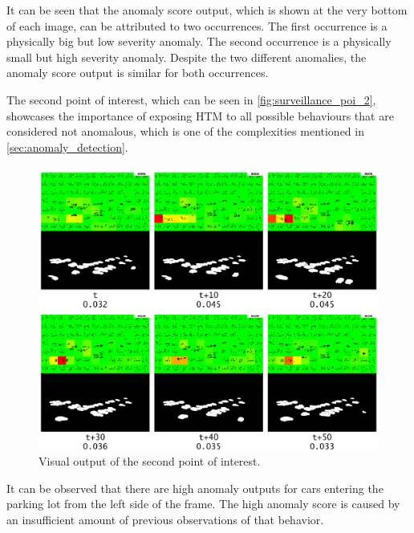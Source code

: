 It can be seen that the anomaly score output, which is shown at the very bottom of each image, can be attributed to two occurrences. The first occurrence is a physically big but low severity anomaly. The second occurrence is a physically small but high severity anomaly. Despite the two different anomalies, the anomaly score output is similar for both occurrences.
\par
The second point of interest, which can be seen in \autoref{fig:surveillance_poi_2}, showcases the importance of exposing HTM to all possible behaviours that are considered not anomalous, which is one of the complexities mentioned in \autoref{sec:anomaly_detection}.
\begin{figure}[H]
    \centering
    \includegraphics[width=\textwidth]{resources/experiments/surveillance/surveillance_poi_2.png}
    \caption[Second POI]{Visual output of the second point of interest.}
    \label{fig:surveillance_poi_2}
\end{figure}
It can be observed that there are high anomaly outputs for cars entering the parking lot from the left side of the frame. The high anomaly score is caused by an insufficient amount of previous observations of that behavior.
